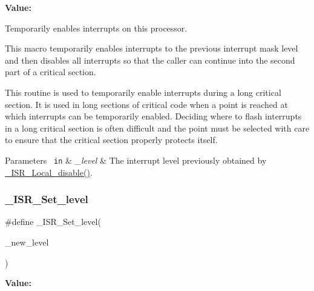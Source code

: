 {\bfseries Value\+:}
\begin{DoxyCode}{0}
\DoxyCodeLine{\textcolor{keywordflow}{do} \{ \(\backslash\)}

\end{DoxyCode}


Temporarily enables interrupts on this processor. 

This macro temporarily enables interrupts to the previous interrupt mask level and then disables all interrupts so that the caller can continue into the second part of a critical section.

This routine is used to temporarily enable interrupts during a long critical section. It is used in long sections of critical code when a point is reached at which interrupts can be temporarily enabled. Deciding where to flash interrupts in a long critical section is often difficult and the point must be selected with care to ensure that the critical section properly protects itself.


\begin{DoxyParams}[1]{Parameters}
\mbox{\texttt{ in}}  & {\em \+\_\+level} & The interrupt level previously obtained by \mbox{\hyperlink{group__RTEMSScoreISR_ga2a829f51f98576aa596562985e1df2fc}{\+\_\+\+I\+S\+R\+\_\+\+Local\+\_\+disable()}}. \\
\hline
\end{DoxyParams}
\mbox{\label{group__RTEMSScoreISR_gad3209e74ff910d9870c298b8adf3fb32}} 
\subsubsection{\texorpdfstring{\_ISR\_Set\_level}{\_ISR\_Set\_level}}
{\footnotesize\ttfamily \#define \+\_\+\+I\+S\+R\+\_\+\+Set\+\_\+level(\begin{DoxyParamCaption}\item[{}]{\+\_\+new\+\_\+level }\end{DoxyParamCaption})}

{\bfseries Value\+:}
\begin{DoxyCode}{0}
\DoxyCodeLine{\textcolor{keywordflow}{do} \{ \(\backslash\)}

\end{DoxyCode}


